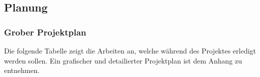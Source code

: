 \newpage
\subsection{Planung} 
\subsubsection{Grober Projektplan}
Die folgende Tabelle zeigt die Arbeiten an, welche während des Projektes erledigt werden sollen. Ein grafischer und detailierter Projektplan ist dem Anhang zu entnehmen.

\begin{table}[H]
\centering
\begin{tabular}{|p{0.7cm}p{6.8cm}p{2cm}p{2cm}|c|c|c|}


\end{tabular}
\end{table}
